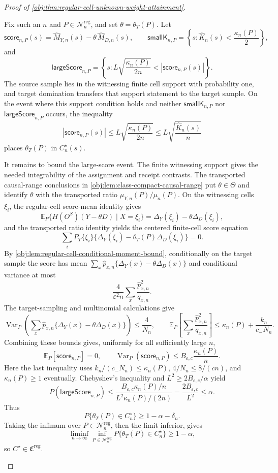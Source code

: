 \begin{proof}[Proof of \cref{obj:thm:regular-cell-unknown-weight-attainment}]
\begin{enumerate}
Fix such an \(n\) and \(P\in\mathcal N_n^{\mathrm{reg}}\), and set \(\theta=\theta_T(P)\). Let
\[
\mathsf{score}_{n,P}(s)
=
\widehat M_{Y,n}(s)-\theta\,\widehat M_{D,n}(s),
\qquad
\mathsf{smallK}_{n,P}
=
\left\{s:\widehat K_n(s)<\frac{\kappa_n(P)}2\right\},
\]
and
\[
\mathsf{largeScore}_{n,P}
=
\left\{s:
L\sqrt{\frac{\kappa_n(P)}{2n}}
<
|\mathsf{score}_{n,P}(s)|
\right\}.
\]
The source sample lies in the witnessing finite cell support with probability one, and target domination transfers that support statement to the target sample. On the event where this support condition holds and neither \(\mathsf{smallK}_{n,P}\) nor \(\mathsf{largeScore}_{n,P}\) occurs, the inequality
\[
|\mathsf{score}_{n,P}(s)|
\le L\sqrt{\frac{\kappa_n(P)}{2n}}
\le L\sqrt{\frac{\widehat K_n(s)}{n}}
\]
places \(\theta_T(P)\) in \(C^\star_n(s)\).

It remains to bound the large-score event. The finite witnessing support gives the needed integrability of the assignment and receipt contrasts. The transported causal-range conclusions in \cref{obj:lem:class-compact-causal-range} put \(\theta\in\Theta\) and identify \(\theta\) with the transported ratio \(\mu_{Y,n}(P)/\mu_n(P)\). On the witnessing cells \(\xi_i\), the regular-cell score-mean identity gives
\[
\mathbb E_P\{H(O^S)(Y-\theta D)\mid X=\xi_i\}
=
\Delta_Y(\xi_i)-\theta\Delta_D(\xi_i),
\]
and the transported ratio identity yields the centered finite-cell score equation
\[
\sum_i P_T\{\xi_i\}
\{\Delta_Y(\xi_i)-\theta_T(P)\Delta_D(\xi_i)\}=0.
\]
By \cref{obj:lem:regular-cell-conditional-moment-bound}, conditionally on the target sample the score has mean
\(\sum_x\widehat p_{x,n}\{\Delta_Y(x)-\theta\Delta_D(x)\}\) and conditional variance at most
\[
\frac{4}{\varepsilon^2n}\sum_x\frac{\widehat p_{x,n}^2}{q_{x,n}}.
\]
The target-sampling and multinomial calculations give
\[
\operatorname{Var}_P\!\left(
\sum_x\widehat p_{x,n}\{\Delta_Y(x)-\theta\Delta_D(x)\}
\right)
\le \frac4{N_n},
\qquad
\mathbb E_P\!\left[\sum_x\frac{\widehat p_{x,n}^2}{q_{x,n}}\right]
\le \kappa_n(P)+\frac{k_n}{c_-N_n}.
\]
Combining these bounds gives, uniformly for all sufficiently large \(n\),
\[
\mathbb E_P[\mathsf{score}_{n,P}]=0,
\qquad
\operatorname{Var}_P(\mathsf{score}_{n,P})
\le
B_{\varepsilon,c}\frac{\kappa_n(P)}{n}.
\]
Here the last inequality uses \(k_n/(c_-N_n)\le\kappa_n(P)\), \(4/N_n\le8/(cn)\), and \(\kappa_n(P)\ge1\) eventually. Chebyshev's inequality and \(L^2\ge 2B_{\varepsilon,c}/\alpha\) yield
\[
P(\mathsf{largeScore}_{n,P})
\le
\frac{B_{\varepsilon,c}\kappa_n(P)/n}
{L^2\kappa_n(P)/(2n)}
=
\frac{2B_{\varepsilon,c}}{L^2}
\le\alpha .
\]
Thus
\[
P\{\theta_T(P)\in C^\star_n\}
\ge 1-\alpha-\delta_n .
\]
Taking the infimum over \(P\in\mathcal N_n^{\mathrm{reg}}\), then the limit inferior, gives
\[
\liminf_{n\to\infty}\inf_{P\in\mathcal N_n^{\mathrm{reg}}}
P\{\theta_T(P)\in C^\star_n\}\ge1-\alpha,
\]
so \(C^\star\in\mathfrak C^{\mathrm{reg}}\). %


\end{enumerate}
\end{proof}
